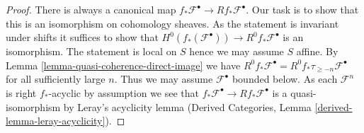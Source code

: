 \documentclass{stacks-project}
\theoremstyle{plain}
\theoremstyle{definition}
\theoremstyle{remark}
\numberwithin{equation}{subsection}
\begin{document}
\begin{proof}
There is always a canonical map
$f_*\mathcal{F}^\bullet \to Rf_*\mathcal{F}^\bullet$.
Our task is to show that this is an isomorphism on cohomology sheaves.
As the statement is invariant under shifts it suffices to show that
$H^0(f_*(\mathcal{F}^\bullet)) \to R^0f_*\mathcal{F}^\bullet$
is an isomorphism. The statement is local on $S$ hence we
may assume $S$ affine. By
Lemma \ref{lemma-quasi-coherence-direct-image}
we have $R^0f_*\mathcal{F}^\bullet = R^0f_*\tau_{\geq -n}\mathcal{F}^\bullet$
for all sufficiently large $n$. Thus we may assume $\mathcal{F}^\bullet$
bounded below. As each $\mathcal{F}^n$ is right $f_*$-acyclic by
assumption we see that $f_*\mathcal{F}^\bullet \to Rf_*\mathcal{F}^\bullet$
is a quasi-isomorphism by Leray's acyclicity lemma (Derived Categories, Lemma
\ref{derived-lemma-leray-acyclicity}).
\end{proof}
\end{document}
